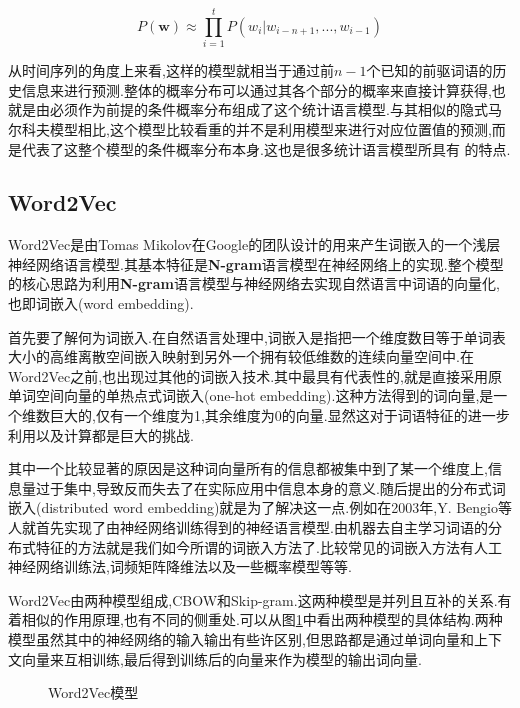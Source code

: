 \begin{equation}
	P(\mathbf{w}) \approx \prod_{i=1}^{t}P(w_i|w_{i-n+1},...,w_{i-1})
\end{equation}

从时间序列的角度上来看,这样的模型就相当于通过前$n-1$个已知的前驱词语的历史信息来进行预测.整体的概率分布可以通过其各个部分的概率来直接计算获得,也就是由必须作为前提的条件概率分布组成了这个统计语言模型.与其相似的隐式马尔科夫模型相比,这个模型比较看重的并不是利用模型来进行对应位置值的预测,而是代表了这整个模型的条件概率分布本身.这也是很多统计语言模型所具有 的特点.

\subsection{Word2Vec}
\label{subsec:word2vec}

Word2Vec是由Tomas Mikolov在Google的团队设计的用来产生词嵌入的一个浅层神经网络语言模型.其基本特征是\textbf{N-gram}语言模型在神经网络上的实现.整个模型的核心思路为利用\textbf{N-gram}语言模型与神经网络去实现自然语言中词语的向量化,也即词嵌入(word embedding).

首先要了解何为词嵌入.在自然语言处理中,词嵌入是指把一个维度数目等于单词表大小的高维离散空间嵌入映射到另外一个拥有较低维数的连续向量空间中.在Word2Vec之前,也出现过其他的词嵌入技术.其中最具有代表性的,就是直接采用原单词空间向量的单热点式词嵌入(one-hot embedding).这种方法得到的词向量,是一个维数巨大的,仅有一个维度为1,其余维度为0的向量.显然这对于词语特征的进一步利用以及计算都是巨大的挑战.

其中一个比较显著的原因是这种词向量所有的信息都被集中到了某一个维度上,信息量过于集中,导致反而失去了在实际应用中信息本身的意义.随后提出的分布式词嵌入(distributed word embedding)就是为了解决这一点.例如在2003年,Y. Bengio等人就首先实现了由神经网络训练得到的神经语言模型\cite{bengio2003neural}.由机器去自主学习词语的分布式特征的方法就是我们如今所谓的词嵌入方法了.比较常见的词嵌入方法有人工神经网络训练法,词频矩阵降维法以及一些概率模型等等.

Word2Vec由两种模型组成,CBOW和Skip-gram.这两种模型是并列且互补的关系.有着相似的作用原理,也有不同的侧重处.可以从图\ref{fig:word2vecmodel}中看出两种模型的具体结构.两种模型虽然其中的神经网络的输入输出有些许区别,但思路都是通过单词向量和上下文向量来互相训练,最后得到训练后的向量来作为模型的输出词向量.

\begin{figure}
  \centering
  \hspace{1in}
  \caption[Word2Vec模型]{Word2Vec模型}
  \label{fig:word2vecmodel}
\end{figure}

